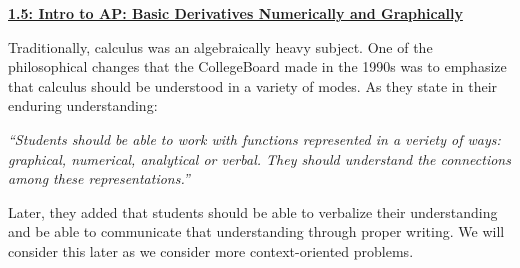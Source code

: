\textbf{\underline{\large{1.5: Intro to AP: Basic Derivatives Numerically and Graphically}}} \par

Traditionally, calculus was an algebraically heavy subject. One of the philosophical changes that the CollegeBoard made in the 1990s was to emphasize that calculus should be understood in a variety of modes. As they state in their enduring understanding: \begin{center}
    \parbox{0.8\textwidth}{\textit{
        ``Students should be able to work with functions represented in a veriety of ways: graphical, numerical, analytical or verbal.  They should understand the connections among these representations.''}
    }
\end{center} \par

Later, they added that students should be able to verbalize their understanding and be able to communicate that understanding through proper writing. We will consider this later as we consider more context-oriented problems.
